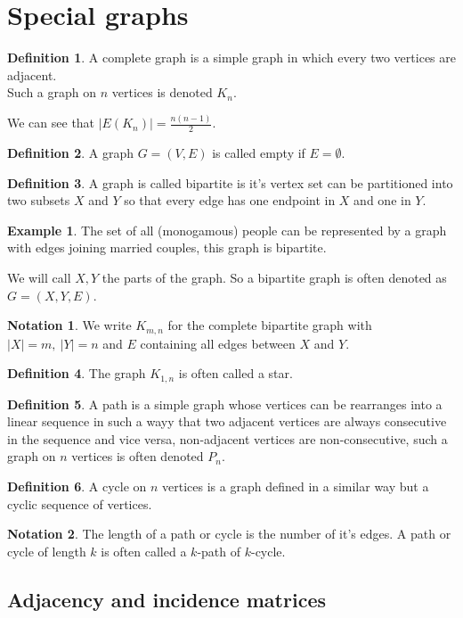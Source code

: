 \documentclass{book}
\theoremstyle{definition}
\newtheorem*{defn}{Definition}
\newtheorem*{ex}{Example}
\newtheorem*{nota}{Notation}
\begin{document}
\section{Special graphs}
\begin{defn}
A complete graph is a simple graph in which every two vertices are adjacent. \\
Such a graph on $n$ vertices is denoted $K_n$.
\end{defn}
We can see that $|E(K_n)| = \frac{n(n-1)}{2}$.
\begin{defn}
A graph $G=(V,E)$ is called empty if $E=\emptyset$.
\end{defn}
\begin{defn}
A graph is called bipartite is it's vertex set can be partitioned into two subsets $X$ and $Y$ so that every edge has one endpoint in $X$ and one in $Y$.
\end{defn}
\begin{ex}
The set of all (monogamous) people can be represented by a graph with edges joining married couples, this graph is bipartite.
\end{ex}
We will call $X,Y$ the parts of the graph. So a bipartite graph is often denoted as $G = (X,Y,E)$.
\begin{nota}
We write $K_{m,n}$ for the complete bipartite graph with $|X| = m,\ |Y| = n$ and $E$ containing all edges between $X$ and $Y$.
\end{nota}
\begin{defn}
The graph $K_{1,n}$ is often called a star.
\end{defn}
\begin{defn}
A path is a simple graph whose vertices can be rearranges into a linear sequence in such a wayy that two adjacent vertices are always consecutive in the sequence and vice versa, non-adjacent vertices are non-consecutive, such a graph on $n$ vertices is often denoted $P_n$.
\end{defn}
\begin{defn}
A cycle on $n$ vertices is a graph defined in a similar way but a cyclic sequence of vertices.
\end{defn}
\begin{nota}
The length of a path or cycle is the number of it's edges. A path or cycle of length $k$ is often called a $k$-path of $k$-cycle.
\end{nota}
\subsection{Adjacency and incidence matrices}
\end{document}

